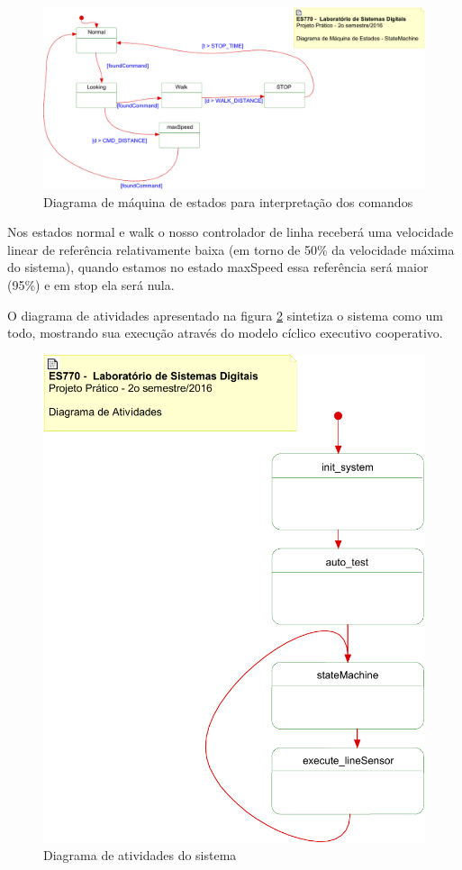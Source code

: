 \documentclass{article}
\begin{document}
\begin{figure}[H]
	\centering
	\includegraphics[width=0.9\linewidth]{stateMachine}
	\caption{Diagrama de máquina de estados para interpretação dos comandos}
	\label{fig:estados}
\end{figure}

Nos estados normal e walk o nosso controlador de linha receberá uma velocidade linear de referência relativamente baixa (em torno de 50\% da velocidade máxima do sistema), quando estamos no estado maxSpeed essa referência será maior (95\%) e em stop ela será nula.

O diagrama de atividades apresentado na figura \ref{fig:main} sintetiza o sistema como um todo, mostrando sua execução através do modelo cíclico executivo cooperativo.

\begin{figure}[H]
	\centering
	\includegraphics[width=0.9\linewidth]{atividades}
	\caption{Diagrama de atividades do sistema}
	\label{fig:main}
\end{figure}
\end{document}

